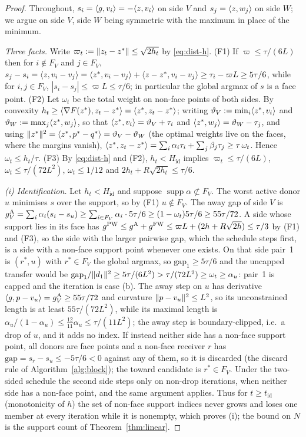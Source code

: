 \begin{proof}
Throughout, $s_i=\langle g, v_i \rangle=-\langle z, v_i \rangle$ on side $V$ and
$s_j=\langle z, w_j \rangle$ on side $W$; we argue on side $V$, side $W$ being
symmetric with the maximum in place of the minimum.

\emph{Three facts.} Write $\varpi_t:=\lVert z_t-z^* \rVert\le\sqrt{2h_t}$
by \eqref{eq:dist-h}. (F1) If $\varpi\le\tau/(6L)$ then for $i\notin F_V$ and
$j\in F_V$,
$s_j-s_i=\langle z, v_i-v_j \rangle=\langle z^*, v_i-v_j \rangle+\langle z-z^*, v_i-v_j \rangle\ge\tau_i-\varpi L\ge5\tau/6$,
while for $i,j\in F_V$, $|s_i-s_j|\le\varpi L\le\tau/6$; in particular the
global argmax of $s$ is a face point. (F2) Let $\omega_t$ be the total
weight on non-face points of both sides. By convexity
$h_t\ge\langle \nabla F(z^*), z_t-z^* \rangle=\langle z^*, z_t-z^* \rangle$; writing
$\vartheta_V:=\min_i\langle z^*, v_i \rangle$ and $\vartheta_W:=\max_j\langle z^*, w_j \rangle$, so that
$\langle z^*, v_i \rangle=\vartheta_V+\tau_i$ and $\langle z^*, w_j \rangle=\vartheta_W-\tau_j$, and using
$\lVert z^* \rVert^2=\langle z^*, p^*-q^* \rangle=\vartheta_V-\vartheta_W$ (the optimal weights live on the
faces, where the margins vanish),
$\langle z^*, z_t-z^* \rangle=\sum_i\alpha_i\tau_i+\sum_j\beta_j\tau_j\ge\tau\,\omega_t$.
Hence $\omega_t\le h_t/\tau$. (F3) By \eqref{eq:dist-h} and (F2),
$h_t<H_{\mathrm{id}}$ implies $\varpi_t\le\tau/(6L)$, $\omega_t\le\tau/(72L^2)$,
$\omega_t\le1/12$ and $2h_t+R\sqrt{2h_t}\le\tau/6$.

\emph{(i) Identification.} Let $h_t<H_{\mathrm{id}}$ and suppose
$\operatorname{supp}\alpha\not\subset F_V$. The worst active donor $u$
minimises $s$ over the support, so by (F1) $u\notin F_V$. The away gap of
side $V$ is $g^{\mathrm{A}}_V=\sum_i\alpha_i(s_i-s_u)\ge\sum_{i\in F_V}\alpha_i\cdot5\tau/6\ge(1-\omega_t)5\tau/6\ge55\tau/72$.
A side whose support lies in its face has
$g^{\mathrm{PW}}\le g^{\mathrm{A}}+g^{\mathrm{FW}}\le\varpi L+(2h+R\sqrt{2h})\le\tau/3$ by (F1) and (F3), so the
side with the larger pairwise gap, which the schedule steps first, is a
side with a non-face support point whenever one exists. On that side
pair~1 is $(r^*,u)$ with $r^*\in F_V$ the global argmax, so
$\mathrm{gap}_1\ge5\tau/6$ and the uncapped transfer would be
$\mathrm{gap}_1/\lVert d_1 \rVert^2\ge5\tau/(6L^2)>\tau/(72L^2)\ge\omega_t\ge\alpha_u$:
pair~1 is capped and the iteration is case (b). The away step on $u$ has
derivative $\langle g, p-v_u \rangle=g^{\mathrm{A}}_V\ge55\tau/72$ and curvature
$\lVert p-v_u \rVert^2\le L^2$, so its unconstrained length is at least
$55\tau/(72L^2)$, while its maximal length is
$\alpha_u/(1-\alpha_u)\le\tfrac{12}{11}\alpha_u\le\tau/(11L^2)$; the
away step is boundary-clipped, i.e.\ a drop of $u$, and it adds no index.
If instead neither side has a non-face support point, all donors are
face points and a non-face receiver $r$ has
$\mathrm{gap}=s_r-s_u\le-5\tau/6<0$ against any of them, so it is
discarded (the discard rule of Algorithm~\ref{alg:block}); the toward candidate is
$r^*\in F_V$. Under the two-sided schedule the second side steps only on
non-drop iterations, when neither side has a non-face point, and the same
argument applies. Thus for $t\ge t_{\mathrm{id}}$ (monotonicity of $h$)
the set of non-face support indices never grows and loses one member at
every iteration while it is nonempty, which proves (i); the bound on $N$
is the support count of Theorem~\ref{thm:linear}.


\end{proof}
